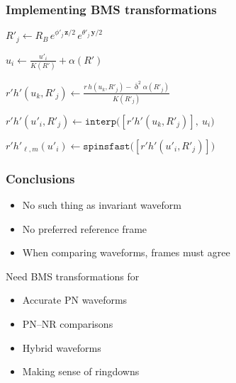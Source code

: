 \documentclass[12pt,xcolor={dvipsnames}]{beamer}
\renewcommand{\vec}{\bm}
\renewcommand{\vec}[1]{\boldsymbol{#1}}
\begin{document}
\begin{frame}
  \frametitle{Implementing BMS transformations}
  \vspace{-0.1in}
  \begin{spacing}{1.75}
    \begin{algorithmic}


      \STATE
      $R'_{j} \gets R_{B}\, e^{\phi'_{j}\, \vec{z}/2}\, e^{\theta'_{j}\,
        \vec{y}/2}$

      \STATE
      $u_{i} \gets \frac{u'_{i}}{K(R')} + \alpha(R')$


      \STATE
      $r' h'(u_{k}, R'_{j}) \gets \frac{r\, h(u_{k}, R'_{j}) -
        \bar{\eth}^{2}\alpha (R'_{j})} {K(R'_{j})}$

      \ENDFOR

      \STATE
      $r'h'(u'_{i}, R'_{j}) \gets \texttt{interp} \big( [r' h'(u_{k},
      R'_{j})],\ u_{i} \big)$

      \ENDFOR

      \STATE
      $r'h'_{\ell, m}(u'_{i}) \gets \texttt{spinsfast} \big(
      [r'h'(u'_{i}, R'_{j})] \big)$

      \ENDFOR
    \end{algorithmic}
  \end{spacing}
\end{frame}

\begin{frame}
  \frametitle{Conclusions}
  \begin{itemize}
  \item No such thing as invariant waveform
  \item No preferred reference frame
  \item When comparing waveforms, frames must agree
  \end{itemize}

  \vspace{0.2in}
  Need BMS transformations for
  \begin{itemize}
  \item Accurate PN waveforms
  \item PN--NR comparisons
  \item Hybrid waveforms
  \item Making sense of ringdowns
  \end{itemize}
\end{frame}
\end{document}
